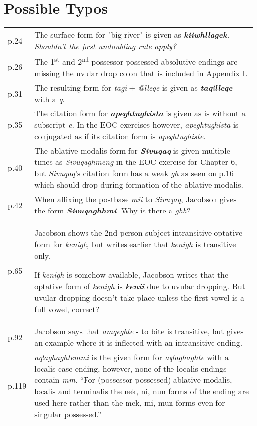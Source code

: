 \documentclass{article}
\begin{document}
\section{Possible Typos}

\begin{tabular}{p{1cm}p{10.5cm}}
p.24 & The surface form for "big river" is given as \textit{\textbf{kiiwhllagek}. Shouldn't the first undoubling rule apply?} \\

p.26 & The 1\textsuperscript{st} and 2\textsuperscript{nd} possessor possessed absolutive endings are missing the uvular drop colon that is included in Appendix I. \\

p.31 & The resulting form for \textit{tagi} + \textit{@lleqe} is given as \textit{\textbf{taqilleqe}} with a \textit{q}. \\

p.35 & The citation form for \textit{\textbf{apeghtughista}} is given as is without a subscript \textit{e}. In the EOC exercises however, \textit{apeghtughista} is conjugated as if its citation form is \textit{apeghtughiste}. \\

p.40 & The ablative-modalis form for \textit{\textbf{Sivuqaq}} is given multiple times as \textit{Sivuqaghmeng} in the EOC exercise for Chapter 6, but \textit{Sivuqaq}'s citation form has a weak \textit{gh} as seen on p.16 which should drop during formation of the ablative modalis.\\

p.42 & When affixing the postbase \textit{mii} to \textit{Sivuqaq}, Jacobson gives the form \textit{\textbf{Sivuqaghhmi}}.
%
Why is there a \textit{ghh}? \\

p.65 & 	Jacobson shows the 2nd person subject intransitive optative form for \textit{kenigh}, but writes earlier that \textit{kenigh} is transitive only.

If \textit{kenigh} is somehow available, Jacobson writes that the optative form of \textit{kenigh} is \textit{\textbf{kenii}} due to uvular dropping.
%
But uvular dropping doesn't take place unless the first vowel is a full vowel, correct? \\

p.92 & Jacobson says that \textit{amqeghte} - to bite is transitive, but gives an example where it is inflected with an intransitive ending. \\

p.119 & \textit{aqlaghaghtemmi} is the given form for \textit{aqlaghaghte} with a localis case ending, however, none of the localis endings contain \textit{mm}.
%
``For (possessor possessed) ablative-modalis, localis and terminalis the nek, ni, nun forms of the ending are used here rather than the mek, mi, mun forms even for singular possessed.''

\end{tabular}
\end{document}
